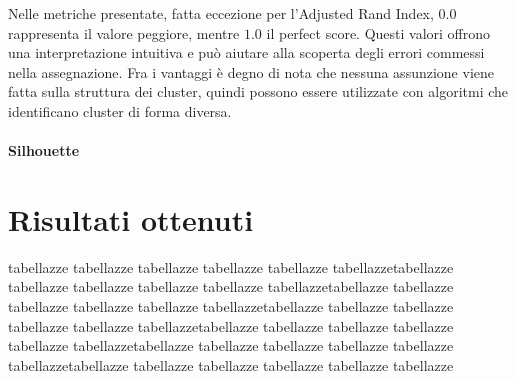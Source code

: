 Nelle metriche presentate, fatta eccezione per l'Adjusted Rand Index, $0.0$ rappresenta il valore peggiore, mentre $1.0$ il perfect score. Questi valori offrono una interpretazione intuitiva e può aiutare alla scoperta degli errori commessi nella assegnazione. Fra i vantaggi è degno di nota che nessuna assunzione viene fatta sulla struttura dei cluster, quindi possono essere utilizzate con algoritmi che identificano cluster di forma diversa.

\paragraph{Silhouette}

\section{Risultati ottenuti}
tabellazze tabellazze tabellazze tabellazze tabellazze tabellazzetabellazze tabellazze tabellazze tabellazze tabellazze tabellazzetabellazze tabellazze tabellazze tabellazze tabellazze tabellazzetabellazze tabellazze tabellazze tabellazze tabellazze tabellazzetabellazze tabellazze tabellazze tabellazze tabellazze tabellazzetabellazze tabellazze tabellazze tabellazze tabellazze tabellazzetabellazze tabellazze tabellazze tabellazze tabellazze tabellazze




